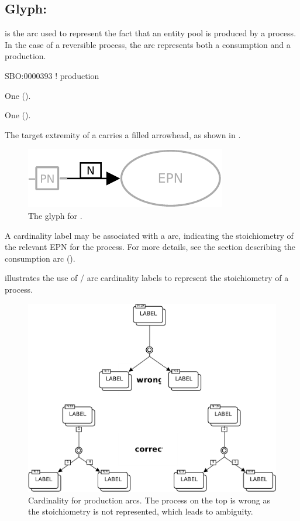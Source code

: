 \subsection{Glyph: }
\label{sec:production}

 is the arc used to represent the fact that an entity pool is produced by a process. In the case of a reversible process, the  arc represents both a consumption and a production.

\begin{glyphDescription}

\glyphSboTerm
SBO:0000393 ! production

\glyphOrigin
One  ().

\glyphTarget
One  ().

\glyphSymbol
The target extremity of a  carries a filled arrowhead, as shown in .

\end{glyphDescription}

\begin{figure}[H]
  \centering
  \includegraphics{images/build/production.pdf}
  \caption{The \PD glyph for .}
  \label{fig:production}
\end{figure}

A cardinality label may be associated with a  arc, indicating the stoichiometry of the relevant EPN for the process. For more details, see the section describing the consumption arc ().

 illustrates the use of / arc cardinality labels to represent the stoichiometry of a process.

\begin{figure}[H]
  \centering
  \includegraphics[scale = 0.6]{images/build/stoich_ex1_example.pdf}
  \caption{Cardinality for production arcs.
  The process on the top is wrong as the stoichiometry is not represented, which leads to ambiguity.}
  \label{fig:prod-card}
\end{figure}
